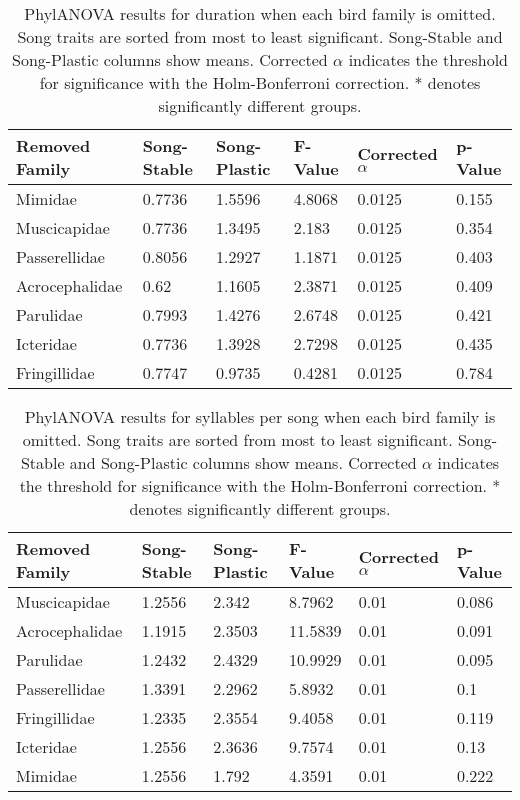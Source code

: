 \documentclass[a4paper,12pt]{article}
\begin{document}
\begin{table}[ht]
\centering
\caption{PhylANOVA results for duration when each bird family is omitted. Song traits are sorted from most to least significant. Song-Stable and Song-Plastic columns show means. Corrected $\alpha$ indicates the threshold for significance with the Holm-Bonferroni correction. * denotes significantly different groups.}
\begin{tabular}{llllll}
  \hline
Removed Family & Song-Stable & Song-Plastic & F-Value & Corrected $\alpha$ & p-Value \\ 
  \hline
Mimidae & 0.7736 & 1.5596 & 4.8068 & 0.0125 & 0.155 \\ 
  Muscicapidae & 0.7736 & 1.3495 & 2.183 & 0.0125 & 0.354 \\ 
  Passerellidae & 0.8056 & 1.2927 & 1.1871 & 0.0125 & 0.403 \\ 
  Acrocephalidae & 0.62 & 1.1605 & 2.3871 & 0.0125 & 0.409 \\ 
  Parulidae & 0.7993 & 1.4276 & 2.6748 & 0.0125 & 0.421 \\ 
  Icteridae & 0.7736 & 1.3928 & 2.7298 & 0.0125 & 0.435 \\ 
  Fringillidae & 0.7747 & 0.9735 & 0.4281 & 0.0125 & 0.784 \\ 
   \hline
\end{tabular}
\end{table}

\begin{table}[ht]
\caption{PhylANOVA results for syllables per song when each bird family is omitted. Song traits are sorted from most to least significant. Song-Stable and Song-Plastic columns show means. Corrected $\alpha$ indicates the threshold for significance with the Holm-Bonferroni correction. * denotes significantly different groups.}
\centering
\begin{tabular}{llllll}
  \hline
Removed Family & Song-Stable & Song-Plastic & F-Value & Corrected $\alpha$ & p-Value \\ 
  \hline
Muscicapidae & 1.2556 & 2.342 & 8.7962 & 0.01 & 0.086 \\ 
  Acrocephalidae & 1.1915 & 2.3503 & 11.5839 & 0.01 & 0.091 \\ 
  Parulidae & 1.2432 & 2.4329 & 10.9929 & 0.01 & 0.095 \\ 
  Passerellidae & 1.3391 & 2.2962 & 5.8932 & 0.01 & 0.1 \\ 
  Fringillidae & 1.2335 & 2.3554 & 9.4058 & 0.01 & 0.119 \\ 
  Icteridae & 1.2556 & 2.3636 & 9.7574 & 0.01 & 0.13 \\ 
  Mimidae & 1.2556 & 1.792 & 4.3591 & 0.01 & 0.222 \\ 
   \hline
\end{tabular}
\end{table}
\end{document}

